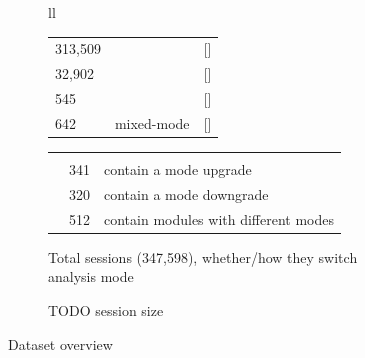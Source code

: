 \documentclass[english,submission,cleveref]{programming}
\begin{document}
\begin{figure}[t]
  \begin{subfigure}[t]{\columnwidth}
    \begin{tabular}[t]{ll}
      \begin{tabular}[t]{lrl}
        313,509 & \mnocheck{}   & [\pct{90.19}] \\
         32,902 & \mnonstrict{} & [\pct{ 9.47}] \\
            545 & \mstrict{}    & [\pct{ 0.16}] \\
            642 & mixed-mode    & [\pct{ 0.18}]
      \end{tabular}
      \begin{tabular}[t]{l@{~~}ll}
        \zerowidth{Among the mixed-mode sessions:} \\
        & 341 & contain a mode upgrade \\
        & 320 & contain a mode downgrade \\
        & 512 & contain modules with different modes
      \end{tabular}
    \end{tabular}
    \caption{Total sessions (347,598), whether/how they switch analysis mode}
    \label{f:total-sessions}
  \end{subfigure}

  \begin{subfigure}[t]{\columnwidth}
    \caption{TODO session size}
    \label{f:sessions-size}
  \end{subfigure}


  \caption{Dataset overview}
  \label{f:dataset-overview}
\end{figure}



\end{document}
